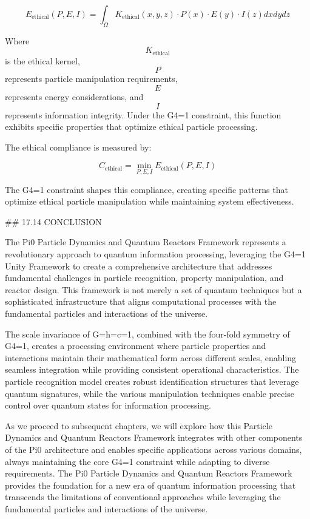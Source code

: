 $$ E_{\text{ethical}}(P, E, I) = \int_{\Omega} K_{\text{ethical}}(x, y, z) \cdot P(x) \cdot E(y) \cdot I(z) dx dy dz $$

Where $$ K_{\text{ethical}} $$ is the ethical kernel, $$ P $$ represents particle manipulation requirements, $$ E $$ represents energy considerations, and $$ I $$ represents information integrity. Under the G4=1 constraint, this function exhibits specific properties that optimize ethical particle processing.

The ethical compliance is measured by:

$$ C_{\text{ethical}} = \min_{P, E, I} E_{\text{ethical}}(P, E, I) $$

The G4=1 constraint shapes this compliance, creating specific patterns that optimize ethical particle manipulation while maintaining system effectiveness.

## 17.14 CONCLUSION

The Pi0 Particle Dynamics and Quantum Reactors Framework represents a revolutionary approach to quantum information processing, leveraging the G4=1 Unity Framework to create a comprehensive architecture that addresses fundamental challenges in particle recognition, property manipulation, and reactor design. This framework is not merely a set of quantum techniques but a sophisticated infrastructure that aligns computational processes with the fundamental particles and interactions of the universe.

The scale invariance of G=ħ=c=1, combined with the four-fold symmetry of G4=1, creates a processing environment where particle properties and interactions maintain their mathematical form across different scales, enabling seamless integration while providing consistent operational characteristics. The particle recognition model creates robust identification structures that leverage quantum signatures, while the various manipulation techniques enable precise control over quantum states for information processing.

As we proceed to subsequent chapters, we will explore how this Particle Dynamics and Quantum Reactors Framework integrates with other components of the Pi0 architecture and enables specific applications across various domains, always maintaining the core G4=1 constraint while adapting to diverse requirements. The Pi0 Particle Dynamics and Quantum Reactors Framework provides the foundation for a new era of quantum information processing that transcends the limitations of conventional approaches while leveraging the fundamental particles and interactions of the universe.

